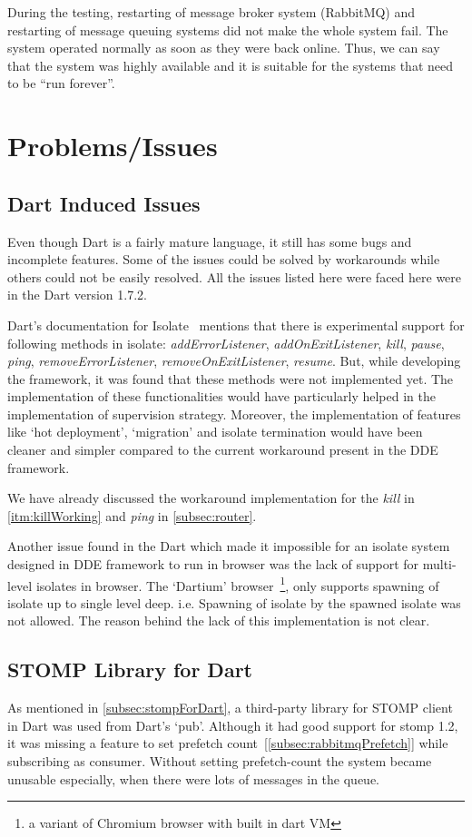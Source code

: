   During the testing, restarting of message broker system (RabbitMQ) and restarting of message queuing systems did not make the whole system fail. The system operated normally as soon as they were back online. Thus, we can say that the system was highly available and it is suitable for the systems that need to be “run forever”.

\section{Problems/Issues}

\subsection{Dart Induced Issues}
  Even though Dart is a fairly mature language, it still has some bugs and incomplete features. Some of the issues could be solved by workarounds while others could not be easily resolved. All the issues listed here were faced here were in the Dart version 1.7.2.

  Dart's documentation for Isolate~\cite{dartApiIsolate} mentions that there is experimental support for following methods in isolate: \emph{addErrorListener},  \emph{addOnExitListener}, \emph{kill}, \emph{pause}, \emph{ping}, \emph{removeErrorListener}, \emph{removeOnExitListener}, \emph{resume}. But, while developing the framework, it was found that these methods were not implemented yet. The implementation of these functionalities would have particularly helped in the implementation of supervision strategy. Moreover, the implementation of features like ‘hot deployment’, ‘migration’ and isolate termination would have been cleaner and simpler compared to the current workaround present in the DDE framework.

  We have already discussed the workaround implementation for the \emph{kill} in \autoref{itm:killWorking} and \emph{ping} in \autoref{subsec:router}.

  Another issue found in the Dart which made it impossible for an isolate system designed in DDE framework to run in browser was the lack of support for multi-level isolates in browser. The ‘Dartium’ browser~\footnote{a variant of Chromium browser with built in dart VM}, only supports spawning of isolate up to single level deep. i.e. Spawning of isolate by the spawned isolate was not allowed. The reason behind the lack of this implementation is not clear.

\subsection{STOMP Library for Dart}
  As mentioned in \autoref{subsec:stompForDart}, a third-party library for STOMP client in Dart was used from Dart's ‘pub’. Although it had good support for stomp 1.2, it was missing a feature to set prefetch count~[\autoref{subsec:rabbitmqPrefetch}] while subscribing as consumer. Without setting prefetch-count the system became unusable especially, when there were lots of messages in the queue.

